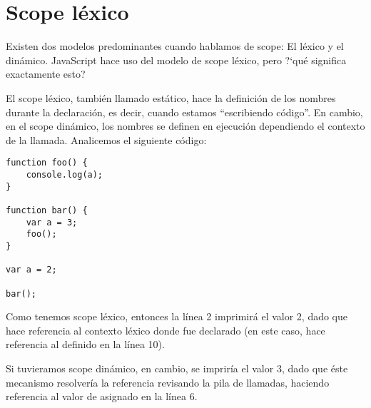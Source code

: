 \section{Scope léxico}
\label{sec:scopelexico}

Existen dos modelos predominantes cuando hablamos de scope: El léxico y el dinámico. JavaScript hace uso del modelo de scope léxico, pero ?`qué significa exactamente esto?

El scope léxico, también llamado estático, hace la definición de los nombres durante la declaración, es decir, cuando estamos "`escribiendo código"'. En cambio, en el scope dinámico, los nombres se definen en ejecución dependiendo el contexto de la llamada. Analicemos el siguiente código:

\begin{lstlisting}
function foo() {
	console.log(a);
}

function bar() {
	var a = 3;
	foo();
}

var a = 2;

bar();
\end{lstlisting}

Como tenemos scope léxico, entonces la línea 2 imprimirá el valor 2, dado que  hace referencia al contexto léxico donde fue declarado (en este caso,  hace referencia al definido en la línea 10). 

Si tuvieramos scope dinámico, en cambio, se impriría el valor 3, dado que éste mecanismo resolvería la referencia revisando la pila de llamadas, haciendo referencia al valor de  asignado en la línea 6.